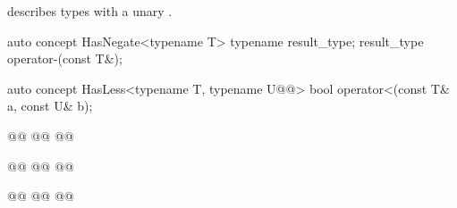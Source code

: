 \documentclass[american,twoside]{book}
\begin{document}
\begin{itemdescr}
\pnum
\mbox{\reallynote} describes types with a unary \mbox{}.
\end{itemdescr}

\begin{itemdecl}
auto concept HasNegate<typename T> {
  typename result_type;
  result_type operator-(const T&);
}
\end{itemdecl}

\begin{itemdescr}
\pnum
{}
\end{itemdescr}

\begin{itemdecl}
auto concept HasLess<typename T, typename U@@> {
  bool operator<(const T& a, const U& b);
}
\end{itemdecl}

\begin{itemdescr}
\pnum
{}
\end{itemdescr}

\begin{itemdecl}
@@
  @@
@\addedCC{\}}@
\end{itemdecl}

\begin{itemdescr}
\pnum
{}
\end{itemdescr}

\begin{itemdecl}
@@
  @@
@\addedCC{\}}@
\end{itemdecl}

\begin{itemdescr}
\pnum
{}
\end{itemdescr}

\begin{itemdecl}
@@
  @@
@\addedCC{\}}@
\end{itemdecl}
\end{document}
